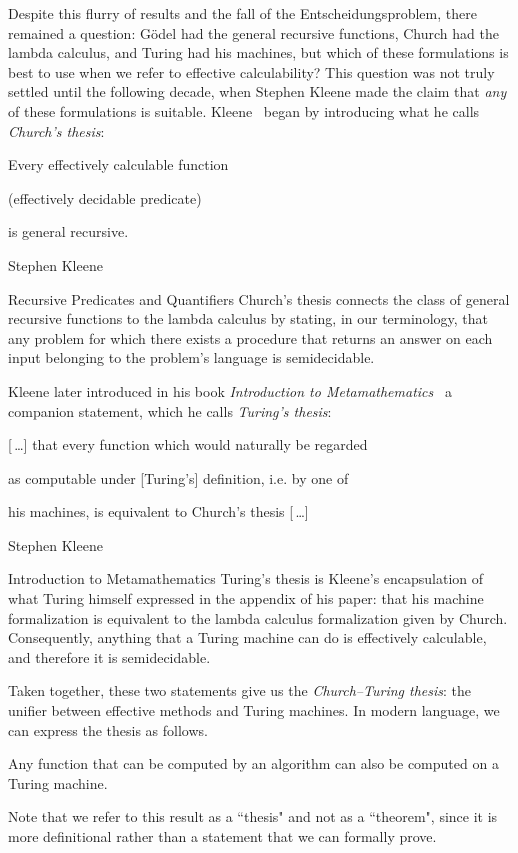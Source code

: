 Despite this flurry of results and the fall of the Entscheidungsproblem, there remained a question: G\"{o}del had the general recursive functions, Church had the lambda calculus, and Turing had his machines, but which of these formulations is best to use when we refer to effective calculability? This question was not truly settled until the following decade, when Stephen Kleene made the claim that \emph{any} of these formulations is suitable. Kleene~\citeyearpar{Kleene1943RecursivePredicates} began by introducing what he calls \emph{Church's thesis}:\par
\epigraph{Every effectively calculable function \par
(effectively decidable predicate) \par
is general recursive.}{Stephen Kleene}{Recursive Predicates and Quantifiers}{}
\vspace{1em}
\noindent
Church's thesis connects the class of general recursive functions to the lambda calculus by stating, in our terminology, that any problem for which there exists a procedure that returns an answer on each input belonging to the problem's language is semidecidable.

Kleene later introduced in his book \textit{Introduction to Metamathematics}~\citeyearpar{Kleene1952IntroductionToMetamathematics} a companion statement, which he calls \emph{Turing's thesis}:\par
\epigraph{\textup{[\,\dots]} that every function which would naturally be regarded \par
as computable under [Turing's] definition, i.e. by one of \par
his machines, is equivalent to Church's thesis \textup{[\,\dots]}}{Stephen Kleene}{Introduction to Metamathematics}{}
\vspace{1em}
\noindent
Turing's thesis is Kleene's encapsulation of what Turing himself expressed in the appendix of his paper: that his machine formalization is equivalent to the lambda calculus formalization given by Church. Consequently, anything that a Turing machine can do is effectively calculable, and therefore it is semidecidable.

Taken together, these two statements give us the \emph{Church--Turing thesis}: the unifier between effective methods and Turing machines. In modern language, we can express the thesis as follows.
\begin{customtitlebox}
Any function that can be computed by an algorithm can also be computed on a Turing machine.
\end{customtitlebox}
\noindent
Note that we refer to this result as a ``thesis" and not as a ``theorem", since it is more definitional rather than a statement that we can formally prove.

